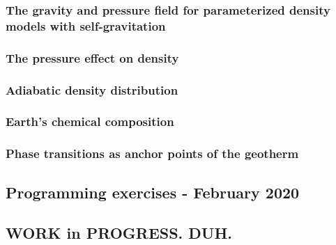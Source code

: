 \documentclass[a4paper]{article}
\begin{document}
\subsubsection{The gravity and pressure field for parameterized density models with self-gravitation}
\label{sect_param_densmod}  %
\subsubsection{The pressure effect on density} %
\label{Pressure_density}  %
\subsubsection{Adiabatic density distribution} %
\label{Adiabatic density distribution}  %
\subsubsection{Earth's chemical composition} %
\label{section-chemical-composition}  %
\subsubsection{Phase transitions as anchor points of the geotherm} %
\label{section-anchor points}  %

\subsection{Programming exercises - February 2020} 

\newpage
\subsection{WORK in PROGRESS. DUH.} %


\end{document}
